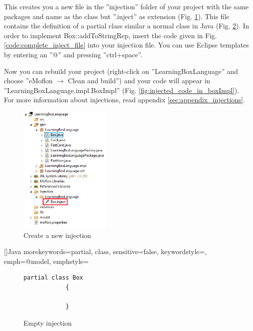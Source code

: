     This creates you a new file in the ''injection'' folder of your project with the same packages and name as the class but ''.inject'' as extension (Fig. \ref{fig:injection_created_injection_file}). This file contains the definition of a partial class similar a normal class in Java (Fig. \ref{code:empty_inject_file}). In order to implement Box::addToStringRep, insert the code given in Fig. \ref{code:complete_inject_file} into your injection file. You can use Eclipse templates by entering an ''@'' and pressing ''ctrl+space''.

    Now you can rebuild your project (right-click on ''LearningBoxLanguage'' and choose ''eMoflon $\rightarrow$ Clean and build'') and your code will appear in ''LearningBoxLanguage.impl.BoxImpl'' (Fig. \ref{fig:injected_code_in_boxImpl}). For more information about injections, read appendix \ref{sec:appendix_injections}.

    \begin{figure}[htbp]
        \centering
        \includegraphics[width=0.4\textwidth]{pics/injectionBilder/newly_created_injection_file.png}
        \caption{Create a new injection}
        \label{fig:injection_created_injection_file}
    \end{figure}

    []{Java}{
        morekeywords={partial, class},
        sensitive=false,
        keywordstyle={\bfseries\color{purple}},
        emph={@model},
        emphstyle={\color{blue}}
    }

    \begin{figure}[htbp]
        \centering
        \begin{lstlisting}[language=Injection]
            partial class Box
            {

            }
        \end{lstlisting}
        \caption{Empty injection}
        \label{code:empty_inject_file}
    \end{figure}


